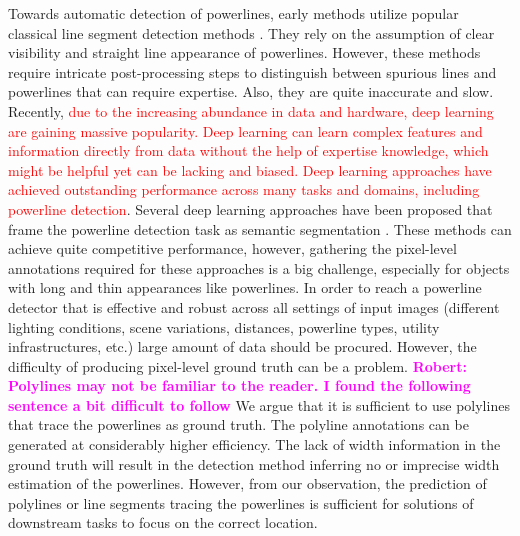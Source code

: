 \documentclass[journal]{IEEEtran}
\newcommand{\commentR}[1]{\textbf{\textcolor{magenta}{Robert: #1}}}
\newcommand{\textK}[1]{\textcolor{red}{#1}}
\begin{document}
Towards automatic detection of powerlines, early methods utilize popular classical line segment detection methods \cite{related_work_kasturi_2002, related_work_guanjian_yan_2007, related_work_li_zhenrong_2010, related_work_candamo_2009, related_work_golightly_2005, related_work_zhengrong_li_2008, related_work_boris_alpatov_2016}. They rely on the assumption of clear visibility and straight line appearance of powerlines. However, these methods require intricate post-processing steps to distinguish between spurious lines and powerlines that can require expertise. Also, they are quite inaccurate and slow. Recently, \textK{due to the increasing abundance in data and hardware, deep learning are gaining massive popularity. Deep learning can learn complex features and information directly from data without the help of expertise knowledge, which might be helpful yet can be lacking and biased. Deep learning approaches have achieved outstanding performance across many tasks and domains, including powerline detection}. Several deep learning approaches have been proposed that frame the powerline detection task as semantic segmentation \cite{related_work_rainesh_mandaan_2017,related_work_heng_zhang_2019,related_work_yan_li_2019,related_work_rabab_abdelfattah_2022,related_work_rabeea_haffari_2021}. These methods can achieve quite competitive performance, however, gathering the pixel-level annotations required for these approaches is a big challenge, especially for objects with long and thin appearances like powerlines. In order to reach a powerline detector that is effective and robust across all settings of input images (different lighting conditions, scene variations, distances, powerline types, utility infrastructures, etc.) large amount of data should be procured. However, the difficulty of producing pixel-level ground truth can be a problem. \commentR{Polylines may not be familiar to the reader. I found the following sentence a bit difficult to follow} We argue that it is sufficient to use polylines that trace the powerlines as ground truth. The polyline annotations can be generated at considerably higher efficiency. The lack of width information in the ground truth will result in the detection method inferring no or imprecise width estimation of the powerlines. However, from our observation, the prediction of polylines or line segments tracing the powerlines is sufficient for solutions of downstream tasks to focus on the correct location.
\end{document}
